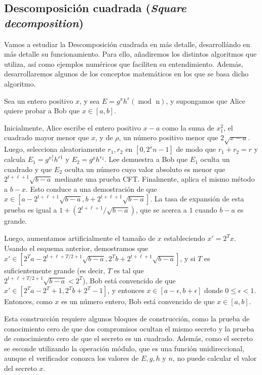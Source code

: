 \subsection{Descomposición cuadrada (\emph{Square decomposition})}

Vamos a estudiar la Descomposición cuadrada en más detalle, desarrollándo en más detalle su funcionamiento. Para ello, añadiremos los distintos algoritmos que utiliza, así como ejemplos numéricos que faciliten su entendimiento. Además, desarrollaremos algunos de los conceptos matemáticos en los que se basa dicho algoritmo.

Sea un entero positivo $x$, y sea $E = g^{x}h^{r} (\operatorname{mod} \text{ n})$, y supongamos que Alice quiere probar a Bob que $x \in [a, b]$.

Inicialmente, Alice escribe el entero positivo $x-a$ como la suma de $x_{1}^{2}$, el cuadrado mayor menor que $x$, y de $\rho$, un número positivo menor que $2\sqrt{x-a}$. Luego, selecciona aleatoriamente $r_{1}, r_{2}$ en $[0, 2^{s}n-1]$ de modo que $r_{1} + r_{2} = r$ y calcula $E_{1} = g^{x_{1}^{2}}h^{r{1}}$ y $E_{2} = g^{\rho}h^{r_{2}}$. Lee demuestra a Bob que $E_{1}$ oculta un cuadrado y que $E_{2}$ oculta un número cuyo valor absoluto es menor que $2^{t+\ell+1}\sqrt{b-a}$ mediante una prueba CFT. Finalmente, aplica el mismo método a $b-x$. Esto conduce a una demostración de que $x \in [a - 2^{t+\ell+1}\sqrt{b-a}, b + 2^{t+\ell+1}\sqrt{b-a}]$. La tasa de expansión de esta prueba es igual a $1 + (2^{t+\ell+1}/\sqrt{b-a})$, que se acerca a $1$ cuando $b-a$ es grande.

Luego, aumentamos artificialmente el tamaño de $x$ estableciendo $x' = 2^{T}x$. Usando el esquema anterior, demostramos que $x' \in [2^{T}a - 2^{t+\ell+T / 2+1} \sqrt{b-a}, 2^{T}b + 2^{t+\ell+1} \sqrt{b-a}]$, y si $T$ es suficientemente grande (es decir, $T$ es tal que \\ $2^{t+\ell+T/2+1} \sqrt{b-a} < 2^{T}$), Bob está convencido de que $x' \in [2^{T}a - 2^{T} + 1, 2^{T}b + 2^{T} - 1]$, y entonces $x \in [a - \epsilon, b + \epsilon]$ donde $0 \leq \epsilon < 1$. Entonces, como $x$ es un número entero, Bob está convencido de que $x \in [a, b]$.

Esta construcción requiere algunos bloques de construcción, como la prueba de conocimiento cero de que dos compromisos ocultan el mismo secreto y la prueba de conocimiento cero de que el secreto es un cuadrado. Además, como el secreto se esconde utilizando la operación módulo, que es una función unidireccional, aunque el verificador conozca los valores de $E, g, h$ y $n$, no puede calcular el valor del secreto $x$.

